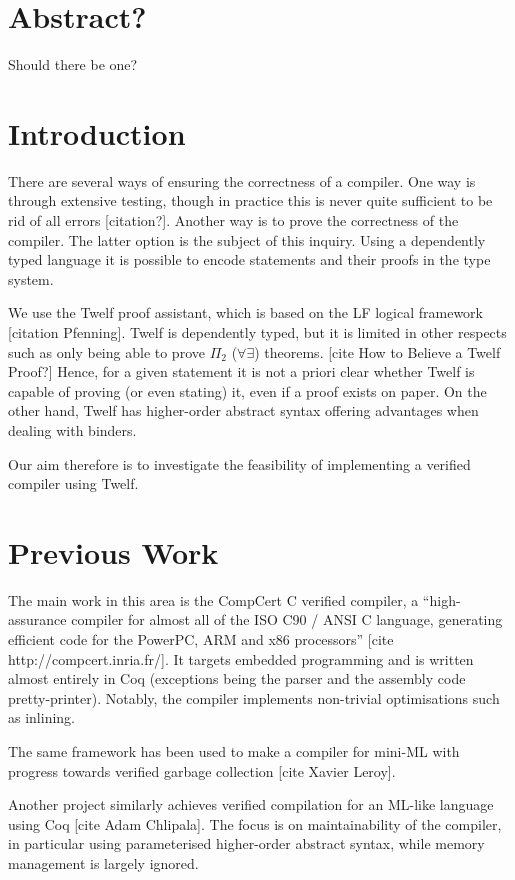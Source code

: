 \section{Abstract?}
Should there be one?

\section{Introduction}


There are several ways of ensuring the correctness of a compiler.
One way is through extensive testing, though in practice this is never quite sufficient to be rid of all errors [citation?].
Another way is to prove the correctness of the compiler.
The latter option is the subject of this inquiry.
Using a dependently typed language it is possible to encode statements and their proofs in the type system.

We use the Twelf proof assistant, which is based on the LF logical framework [citation Pfenning].
Twelf is dependently typed, but it is limited in other respects such as only being able to prove $\Pi_2$ ($\forall \exists$) theorems. [cite How to Believe a Twelf Proof?]
Hence, for a given statement it is not a priori clear whether Twelf is capable of proving (or even stating) it, even if a proof exists on paper.
On the other hand, Twelf has higher-order abstract syntax offering advantages when dealing with binders.

Our aim therefore is to investigate the feasibility of implementing a verified compiler using Twelf.

\section{Previous Work}

The main work in this area is the CompCert C verified compiler, a ``high-assurance compiler for almost all of the ISO C90 / ANSI C language, generating efficient code for the PowerPC, ARM and x86 processors'' [cite http://compcert.inria.fr/].
It targets embedded programming and is written almost entirely in Coq (exceptions being the parser and the assembly code pretty-printer).
Notably, the compiler implements non-trivial optimisations such as inlining.

The same framework has been used to make a compiler for mini-ML with progress towards verified garbage collection [cite Xavier Leroy].

Another project similarly achieves verified compilation for an ML-like language using Coq [cite Adam Chlipala].
The focus is on maintainability of the compiler, in particular using parameterised higher-order abstract syntax, while memory management is largely ignored.

